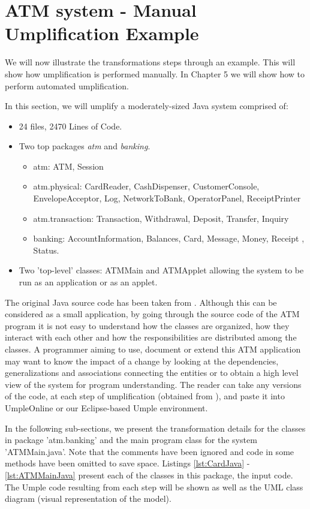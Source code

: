 \section{ATM system - Manual Umplification Example}

We will now illustrate the transformations steps through an example. This will show how umplification is performed manually. In Chapter 5 we will show how to perform automated umplification.

In this section, we will umplify a moderately-sized Java system  comprised of:

\begin{itemize}
 \item 24 files, 2470 Lines of Code.
 \item Two top packages \textit{atm} and \textit{banking}.
	\begin{itemize}
	 \item atm: ATM, Session
	 \item atm.physical: CardReader, CashDispenser, CustomerConsole, EnvelopeAcceptor, Log, NetworkToBank, OperatorPanel, ReceiptPrinter
	 \item atm.transaction: Transaction, Withdrawal, Deposit, Transfer, Inquiry
	 \item banking: AccountInformation, Balances, Card, Message, Money, Receipt , Status.
	\end{itemize}
 \item Two 'top-level' classes: ATMMain and ATMApplet allowing the system to be run as an application or as an applet.
\end{itemize}

The original Java source code has been taken from \cite{atmsystem}. Although this can be considered as a small application, by going through the source code of the ATM program it is not easy to understand how the classes are organized, how they interact with each other and how the responsibilities are distributed among the classes. A programmer aiming to use, document or extend this ATM application may want to know the impact of a change by looking at the dependencies, generalizations and associations connecting the entities or to obtain a high level view of the system for program understanding. The reader can take any versions of the code, at each step of umplification (obtained from \cite{UmplificationBasicExampleURL}), and paste it into UmpleOnline \cite{UmpleOnline} or our Eclipse-based Umple environment. 

In the following sub-sections, we present the transformation details for the classes in package 'atm.banking' and the main program class for the system 'ATMMain.java'. Note that the comments have been ignored and code in some methods have been omitted to save space.  Listings \ref{lst:CardJava} - \ref{lst:ATMMainJava} present each of the classes in this package, the input code. The Umple code resulting from each step will be shown as well as the UML class diagram (visual representation of the model). 

